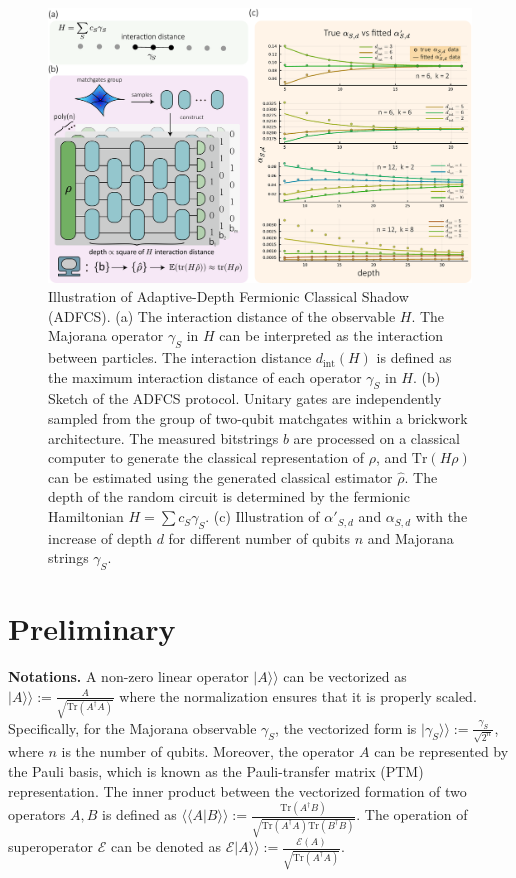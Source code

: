 \documentclass[showpacs,onecolumn,aps,prx,long bibliography,superscriptaddress,notitlepage]{revtex4-1}
\newcommand{\supket}[1]{|#1 \rangle\rangle}
\newcommand{\supbraket}[1]{\langle\langle #1 \rangle\rangle}
\newcommand{\tra}[1]{\text{Tr}\left( #1 \right)}
\newcommand{\Ecal}{\mathcal{E}}
\begin{document}
\begin{figure}
    \centering
    \includegraphics[width=0.9\linewidth]{figures/main/figure1_v4.pdf}
    \caption{\centering Illustration of Adaptive-Depth Fermionic Classical Shadow (ADFCS).
(a) The interaction distance of the observable $H$. The Majorana operator $\gamma_S$ in $H$ can be interpreted as the interaction between particles. 
The interaction distance $d_\text{int}(H)$ is defined as the maximum interaction distance of each operator $\gamma_S$ in $H$.
(b) Sketch of the ADFCS protocol. Unitary gates are independently sampled from the group of two-qubit matchgates within a brickwork architecture. The measured bitstrings $b$ are processed on a classical computer to generate the classical representation of $\rho$, and $\mathrm{Tr}(H \rho)$ can be estimated using the generated classical estimator $\hat{\rho}$. The depth of the random circuit is determined by the fermionic Hamiltonian $H = \sum c_S \gamma_S$.
 (c) Illustration of $\alpha'_{S,d}$ and $\alpha_{S,d}$ with the increase of depth $d$ for different number of qubits $n$ and Majorana strings $\gamma_S$. 
 } 
    \label{fig:sketch}
\end{figure}


\section{Preliminary}

\noindent\textbf{Notations.} 
 A non-zero linear operator $\supket{A}$ can be vectorized as $\supket{A}:=\frac{A}{\sqrt{\tra{A^\dagger A}}}$ where the normalization ensures that it is properly scaled. 
Specifically, for the Majorana observable
$\gamma_S$, the vectorized form is
$\supket{\gamma_S}:=\frac{\gamma_S}{\sqrt{2^n}}$, where $n$ is the number of qubits. Moreover, the operator $A$ can be represented by the Pauli basis, which is known as the Pauli-transfer matrix (PTM) representation. 
The inner product between the vectorized formation of two operators $A,B$ is defined as $\supbraket{A|B} :=\frac{\tra{A^\dagger B}}{\sqrt{\tra{A^\dagger A} \tra{B^\dagger B}}}$. The operation of superoperator $\Ecal$ can be denoted as $\Ecal\supket{A}:=\frac{\Ecal(A)}{\sqrt{\tra{A^\dagger A}}}$. 
\end{document}

